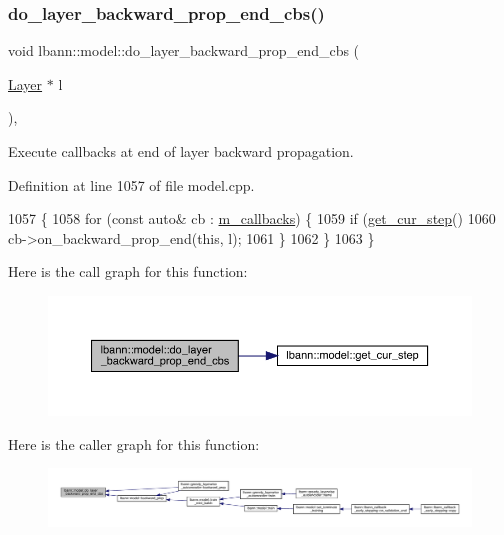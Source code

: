 \subsubsection{\texorpdfstring{do\+\_\+layer\+\_\+backward\+\_\+prop\+\_\+end\+\_\+cbs()}{do\_layer\_backward\_prop\_end\_cbs()}}
{\footnotesize\ttfamily void lbann\+::model\+::do\+\_\+layer\+\_\+backward\+\_\+prop\+\_\+end\+\_\+cbs (\begin{DoxyParamCaption}\item[{\hyperlink{classlbann_1_1Layer}{Layer} $\ast$}]{l }\end{DoxyParamCaption})\hspace{0.3cm}{\ttfamily [protected]}, {\ttfamily [virtual]}}

Execute callbacks at end of layer backward propagation. 

Definition at line 1057 of file model.\+cpp.


\begin{DoxyCode}
1057                                                    \{
1058   \textcolor{keywordflow}{for} (\textcolor{keyword}{const} \textcolor{keyword}{auto}& cb : \hyperlink{classlbann_1_1model_a07b511fef30368494c2ad80922ffd0eb}{m\_callbacks}) \{
1059     \textcolor{keywordflow}{if} (\hyperlink{classlbann_1_1model_ad0cdcba177434b52dc9c4a97be183a92}{get\_cur\_step}() %
1060       cb->on\_backward\_prop\_end(\textcolor{keyword}{this}, l);
1061     \}
1062   \}
1063 \}
\end{DoxyCode}
Here is the call graph for this function\+:\nopagebreak
\begin{figure}[H]
\begin{center}
\leavevmode
\includegraphics[width=350pt]{classlbann_1_1model_ab0939d2668cca7efc2cc52355d34df3b_cgraph}
\end{center}
\end{figure}
Here is the caller graph for this function\+:\nopagebreak
\begin{figure}[H]
\begin{center}
\leavevmode
\includegraphics[width=350pt]{classlbann_1_1model_ab0939d2668cca7efc2cc52355d34df3b_icgraph}
\end{center}
\end{figure}
\mbox{\label{classlbann_1_1model_ac19ce0dd060f9caddd6e14974a6e7713}} 
